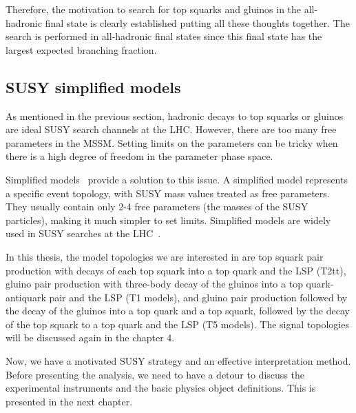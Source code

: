 Therefore, the motivation to search for top squarks and gluinos in the all-hadronic final state is clearly established putting all these thoughts together. The search is performed in all-hadronic final states since this final state has the largest expected branching fraction.

\subsection{SUSY simplified models}
As mentioned in the previous section, hadronic decays to top squarks or gluinos are ideal SUSY search channels at the LHC. However, there are too many free parameters in the MSSM. Setting limits on the parameters can be tricky when there is a high degree of freedom in the parameter phase space. 

Simplified models~\cite{Alwall:2008ag} provide a solution to this issue. A simplified model represents a specific event topology, with SUSY mass values treated as free parameters. They usually contain only 2-4 free parameters (the masses of the SUSY particles), making it much simpler to set limits. Simplified models are widely used in SUSY searches at the LHC~\cite{CMS-SMS-paper}.

In this thesis, the model topologies we are interested in are top squark pair production with decays of each top squark into a top quark and the LSP (T2tt), gluino pair production with three-body decay of the gluinos into a top quark-antiquark pair and the LSP (T1 models), and gluino pair production followed by the decay of the gluinos into a top quark and a top squark, followed by the decay of the top squark to a top quark and the LSP (T5 models). The signal topologies will be discussed again in the chapter 4.

Now, we have a motivated SUSY strategy and an effective interpretation method. Before presenting the analysis, we need to have a detour to discuss the experimental instruments and the basic physics object definitions. This is presented in the next chapter. 
